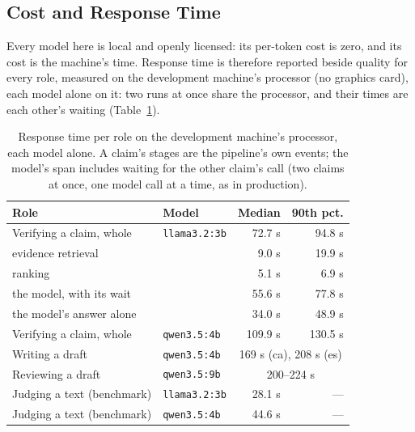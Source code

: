 
\subsection{Cost and Response Time}
\label{subsec:results-response-time}

Every model here is local and openly licensed: its per-token cost is
zero, and its cost is the machine's time. Response time is therefore
reported beside quality for every role, measured on the development
machine's processor (no graphics card), each model alone on it: two
runs at once share the processor, and their times are each other's
waiting (Table~\ref{tab:response-time}).

\begin{table}[ht]
\centering
\small
\begin{tabular}{@{}llrr@{}}
\toprule
Role & Model & Median & 90th pct. \\
\midrule
Verifying a claim, whole & \texttt{llama3.2:3b} & 72.7 s & 94.8 s \\
\quad evidence retrieval & & 9.0 s & 19.9 s \\
\quad ranking & & 5.1 s & 6.9 s \\
\quad the model, with its wait & & 55.6 s & 77.8 s \\
\quad the model's answer alone & & 34.0 s & 48.9 s \\
Verifying a claim, whole & \texttt{qwen3.5:4b} & 109.9 s & 130.5 s \\
Writing a draft & \texttt{qwen3.5:4b} & \multicolumn{2}{c}{169 s (ca), 208 s (es)} \\
Reviewing a draft & \texttt{qwen3.5:9b} & \multicolumn{2}{c}{200--224 s} \\
Judging a text (benchmark) & \texttt{llama3.2:3b} & 28.1 s & --- \\
Judging a text (benchmark) & \texttt{qwen3.5:4b} & 44.6 s & --- \\
\bottomrule
\end{tabular}
\caption[Response time per role]{Response time per role on the
development machine's processor, each model alone. A claim's stages are
the pipeline's own events; the model's span includes waiting for the
other claim's call (two claims at once, one model call at a time, as in
production).}
\label{tab:response-time}
\end{table}

